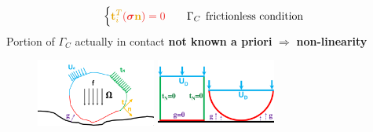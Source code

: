 \documentclass[8pt, oneside]{beamer}   	%
\newcommand{\bn}{\textbf{n}}
\newcommand{\bt}{\textbf{t}}
\newcommand{\bsigma}{\boldsymbol{\sigma}}
\newcommand{\colo}{\color{orange}}
\newcommand{\colk}{\color{black}}
\newcommand{\colgold}{\color{gold}}
\begin{document}
\begin{frame}
\begin{itemize}
{\begin{align*}
\begin{cases}
\colgold \bt_i^T \colo(\bsigma \colgold \bn \colo) =0  \quad & \Gamma_C  \:\: \colk{\text{frictionless condition}}
\end{cases}
\end{align*}
Portion of $\Gamma_C$ actually in contact \textbf{not known a priori} $\Rightarrow$ \textbf{non-linearity}
\begin{figure}[htbp!]
		\centering
	\includegraphics[width=0.35\textwidth]{img/contactproblem.pdf}\qquad
	\includegraphics[width=0.35\textwidth]{img/squarecircle.pdf}
		\label{abb_arc}
\end{figure}
}
\end{itemize}
\end{frame}


\end{document}
